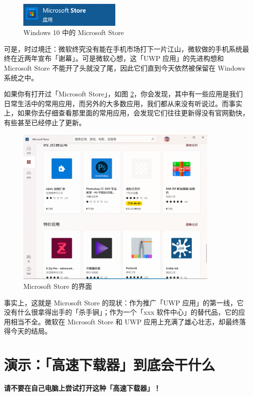 \begin{figure}[H]
  \centering
  \includegraphics[width=5cm]{assets/MS_Store_1.png}
  \caption{Windows 10 中的 Microsoft Store}
  \label{ms-store-in-windows-10}
\end{figure}

可是，时过境迁：微软终究没有能在手机市场打下一片江山，微软做的手机系统最终在近两年宣布「谢幕」。可是微软心想，这「UWP 应用」的先进构想和 Microsoft Store 不能开了头就没了尾，因此它们直到今天依然被保留在 Windows 系统之中。

如果你有打开过「Microsoft Store」，如图 \ref{ms-store}，你会发现，其中有一些应用是我们日常生活中的常用应用，而另外的大多数应用，我们都从来没有听说过。而事实上，如果你去仔细查看那里面的常用应用，会发现它们往往更新得没有官网勤快，有些甚至已经停止了更新。

\begin{figure}[htb!]
  \centering
  \includegraphics[width=10cm]{assets/MS_Store_2.png}
  \caption{Microsoft Store 的界面}
  \label{ms-store}
\end{figure}

事实上，这就是 Microsoft Store 的现状：作为推广「UWP 应用」的第一线，它没有什么很拿得出手的「杀手锏」；作为一个「xxx 软件中心」的替代品，它的应用相当不全。微软在 Microsoft Store 和 UWP 应用上充满了雄心壮志，却最终落得今天的结局。

\section{演示：「高速下载器」到底会干什么}

\begin{warning}
  \textbf{请不要在自己电脑上尝试打开这种「高速下载器」！}
\end{warning}

